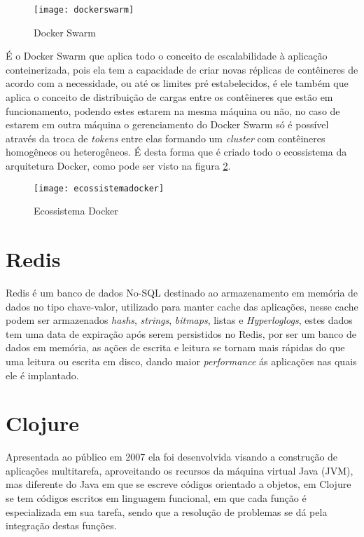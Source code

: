 \begin{figure}[!h]
\caption{\label{fig:dockerswarm} Docker Swarm}
\begin{center}
\texttt{[image: dockerswarm]}
\end{center}
\end{figure}


É o Docker Swarm que aplica todo o conceito de escalabilidade à aplicação conteinerizada, pois ela tem a capacidade de criar novas réplicas de contêineres de acordo com a necessidade, ou até os limites pré estabelecidos, é ele também que aplica o conceito de distribuição de cargas entre os contêineres que estão em funcionamento, podendo estes estarem na mesma máquina ou não, no caso de estarem em outra máquina o gerenciamento do Docker Swarm só é possível através da troca de \textit{tokens} entre elas formando um \textit{cluster} com contêineres homogêneos ou heterogêneos. É desta forma que é criado todo o ecossistema da arquitetura Docker, como pode ser visto na figura \ref{fig:ecossistemadocker}.~\cite{dockerswarm}  

\begin{figure}[!h]
\caption{\label{fig:ecossistemadocker} Ecossistema Docker}
\begin{center}
\texttt{[image: ecossistemadocker]}
\end{center}
\end{figure}

\section{Redis}
\label{sec:redis}
Redis é um banco de dados No-SQL destinado ao armazenamento em memória de dados no tipo chave-valor, utilizado para manter cache das aplicações, nesse cache podem ser armazenados \textit{hashs}, \textit{strings}, \textit{bitmaps}, listas e \textit{Hyperloglogs}, estes dados tem uma data de expiração após serem persistidos no Redis, por ser um banco de dados em memória, as ações de escrita e leitura se tornam mais rápidas do que uma leitura ou escrita em disco, dando maior \textit{performance} ás aplicações nas quais ele é implantado.~\cite{da2015redis}

\section{Clojure}
Apresentada ao público em 2007 ela foi desenvolvida visando a construção de aplicações multitarefa, aproveitando os recursos da máquina virtual Java (JVM), mas diferente do Java em que se escreve códigos orientado a objetos, em Clojure se tem códigos escritos em linguagem funcional, em que cada função é especializada em sua tarefa, sendo que a resolução de problemas se dá pela integração destas funções.

